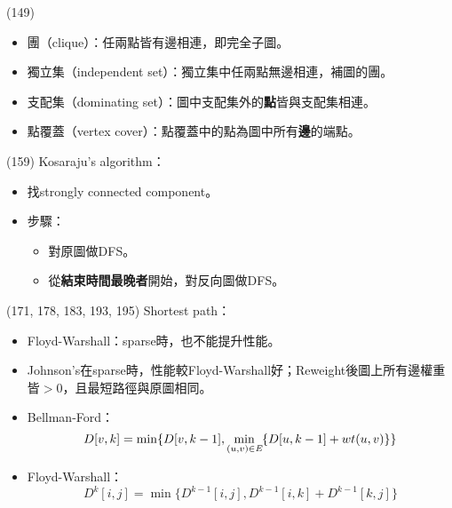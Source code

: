 \item \begin{theorem}{(149)} \quad\quad
    \begin{itemize}
        \item 團（clique）：任兩點皆有邊相連，即完全子圖。
        \item 獨立集（independent set）：獨立集中任兩點無邊相連，補圖的團。
        \item 支配集（dominating set）：圖中支配集外的\textbf{點}皆與支配集相連。
        \item 點覆蓋（vertex cover）：點覆蓋中的點為圖中所有\textbf{邊}的端點。
    \end{itemize}
\end{theorem}

\item \begin{theorem}{(159)} Kosaraju's algorithm： \begin{itemize}
        \item 找strongly connected component。
        \item 步驟：\begin{itemize}
            \item 對原圖做DFS。
            \item 從\textbf{結束時間最晚者}開始，對反向圖做DFS。
        \end{itemize}
    \end{itemize}
\end{theorem}

\item \begin{theorem}{(171, 178, 183, 193, 195)} Shortest path： \begin{itemize}
        \item Floyd-Warshall：sparse時，也不能提升性能。
        \item Johnson's在sparse時，性能較Floyd-Warshall好；Reweight後圖上所有邊權重皆$>0$，且最短路徑與原圖相同。
        \item Bellman-Ford：\begin{equation}
            D[v, k] = \min \{D[v, k - 1], \min_{(u, v) \in \textit{E}} \{D[u, k - 1] + wt(u, v)\}\}
        \end{equation}
        \item Floyd-Warshall：\begin{equation}
            D^k[i, j] = \min\{D^{k - 1}[i, j], D^{k - 1}[i, k] + D^{k - 1}[k, j]\}
        \end{equation}
    \end{itemize}
\end{theorem}

